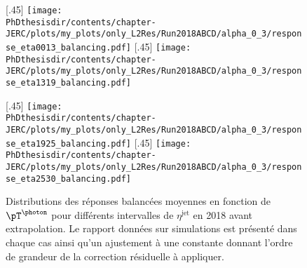 \begin{figure}[p]
\centering
{}[.45\textwidth]
{\texttt{[image: \\PhDthesisdir/contents/chapter-JERC/plots/my\_plots/only\_L2Res/Run2018ABCD/alpha\_0\_3/response\_eta0013\_balancing.pdf]}}
\hfill
{}[.45\textwidth]
{\texttt{[image: \\PhDthesisdir/contents/chapter-JERC/plots/my\_plots/only\_L2Res/Run2018ABCD/alpha\_0\_3/response\_eta1319\_balancing.pdf]}}

\vfill

[.45\textwidth]
{\texttt{[image: \\PhDthesisdir/contents/chapter-JERC/plots/my\_plots/only\_L2Res/Run2018ABCD/alpha\_0\_3/response\_eta1925\_balancing.pdf]}}
\hfill
{}[.45\textwidth]
{\texttt{[image: \\PhDthesisdir/contents/chapter-JERC/plots/my\_plots/only\_L2Res/Run2018ABCD/alpha\_0\_3/response\_eta2530\_balancing.pdf]}}

\caption[Réponses balancées en 2018 avant extrapolation.]{Distributions des réponses balancées moyennes en fonction de $\pT^{\text{\photon}}$ pour différents intervalles de $\eta^\text{jet}$ en 2018 avant extrapolation. Le rapport données sur simulations est présenté dans chaque cas ainsi qu'un ajustement à une constante donnant l'ordre de grandeur de la correction résiduelle à appliquer.}
\label{fig-responses_balancing_alpha_0_3_2018ABCD}
\end{figure}